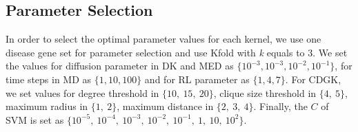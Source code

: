 \documentclass{esannV2}
\begin{document}
\subsection{Parameter Selection}
In order to select the optimal parameter values for each kernel, we use one disease gene set for parameter selection and use Kfold with \textit{k} equals to 3. We set the values for diffusion parameter in DK and MED as $\lbrace 10^{-3}, 10^{-3}, 10^{-2}, 10^{-1} \rbrace$, for time steps in MD as $\lbrace 1, 10, 100 \rbrace$ and for RL parameter as $\lbrace 1, 4, 7 \rbrace$. For CDGK, we set values for degree threshold in $\lbrace 10,\ 15,\ 20 \rbrace$, clique size threshold in $\lbrace 4,\ 5 \rbrace$, maximum radius in $\lbrace 1,\ 2 \rbrace$, maximum distance in $\lbrace 2,\ 3,\ 4 \rbrace$. Finally, the $C$ of SVM is set as $\lbrace 10^{-5},  \ 10^{-4}, \ 10^{-3},\ 10^{-2},\ 10^{-1},\ 1,\ 10,\ 10^2 \rbrace$.
\end{document}
